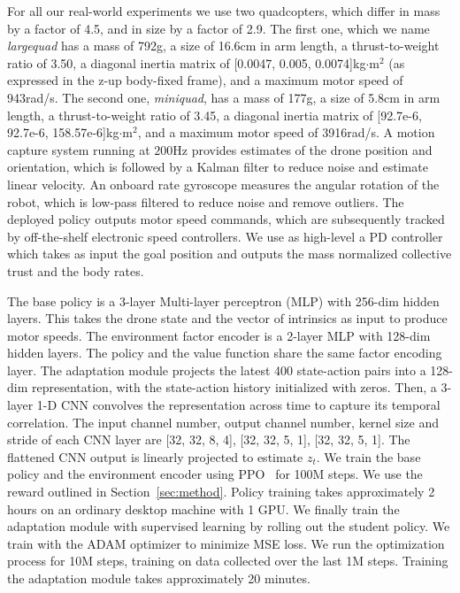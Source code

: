  For all our real-world experiments we use two quadcopters, which differ in mass by a factor of 4.5, and in size by a factor of 2.9. 
The first one, which we name \emph{largequad} has a mass of 792g, a size of 16.6cm in arm length, a thrust-to-weight ratio of 3.50, a diagonal inertia matrix of [0.0047, 0.005, 0.0074]kg$\cdot$m$^2$ (as expressed in the z-up body-fixed frame), and a maximum motor speed of 943rad/s. The second one, \emph{miniquad}, has a mass of 177g, a size of 5.8cm in arm length, a thrust-to-weight ratio of 3.45, a diagonal inertia matrix of [92.7e-6, 92.7e-6, 158.57e-6]kg$\cdot$m$^2$, and a maximum motor speed of 3916rad/s.
%
A motion capture system running at $200$Hz provides estimates of the drone position and orientation, which is followed by a Kalman filter to reduce noise and estimate linear velocity.
%
An onboard rate gyroscope measures the angular rotation of the robot, which is low-pass filtered to reduce noise and remove outliers.
%
The deployed policy outputs motor speed commands, which are subsequently tracked by off-the-shelf electronic speed controllers.
%
We use as high-level a PD controller which takes as input the goal position and outputs the mass normalized collective trust and the body rates.

 The base policy is a 3-layer Multi-layer perceptron (MLP) with 256-dim hidden layers. This takes the drone state and the vector of intrinsics as input to produce motor speeds. The environment factor encoder is a 2-layer MLP with 128-dim hidden layers.  The policy and the value function share the same factor encoding layer. The adaptation module projects the latest 400 state-action pairs into a 128-dim representation, with the state-action history initialized with zeros. Then, a 3-layer 1-D CNN convolves the representation across time to capture its temporal correlation. The input channel number, output channel number, kernel size and stride of each CNN layer are [32, 32, 8, 4], [32, 32, 5, 1], [32, 32, 5, 1]. The flattened CNN output is linearly projected to estimate $z_t$. We train the base policy and the environment encoder using PPO~\cite{schulman2017proximal} for 100M steps. We use the reward outlined in Section~\ref{sec:method}. Policy training takes approximately 2 hours on an ordinary desktop machine with 1 GPU.
%
We finally train the adaptation module with supervised learning by rolling out the student policy. We train with the ADAM optimizer to minimize MSE loss. 
%
We run the optimization process for 10M steps, training on data collected over the last 1M steps. Training the adaptation module takes approximately 20 minutes.



